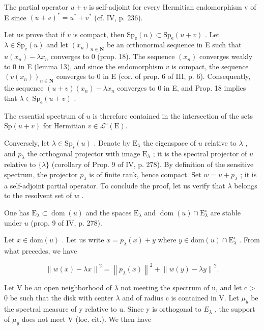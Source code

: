 The partial operator \(u + v\) is self-adjoint for every Hermitian endomorphism v of E since \((u + v)^{*} = u^{*} + v^{*}\) (cf. IV, p. 236).

Let us prove that if \(v\) is compact, then \(\mathrm{Sp_e}(u) \subset \mathrm{Sp_e}(u + v)\) . Let \(\lambda \in \mathrm{Sp_e}(u)\) and let \((x_n)_{n \in \mathbf{N}}\) be an orthonormal sequence in E such that \(u(x_n) - \lambda x_n\) converges to 0 (prop. 18). The sequence \((x_n)\) converges weakly to 0 in E (lemma 13), and since the endomorphism \(v\) is compact, the sequence \((v(x_n))_{n \in \mathbf{N}}\) converges to 0 in E (cor. of prop. 6 of III, p. 6). Consequently, the sequence \((u+v)(x_{n})-\lambda x_{n}\) converges to 0 in E, and Prop. 18 implies that \(\lambda\in\mathrm{Sp}_{\mathrm{e}}(u+v)\) .

The essential spectrum of \(u\) is therefore contained in the intersection of the sets \(\mathrm{Sp}(u + v)\) for Hermitian \(v \in \mathcal{L}^{\mathrm{c}}(\mathrm{E})\).

Conversely, let \(\lambda \in \mathrm{Sp}_{\mathrm{s}}(u)\) . Denote by \(\mathrm{E}_{\lambda}\) the eigenspace of \(u\) relative to \(\lambda\) , and \(p_{\lambda}\) the orthogonal projector with image \(\mathrm{E}_{\lambda}\) ; it is the spectral projector of \(u\) relative to \(\{\lambda\}\) (corollary of Prop. 9 of IV, p. 278). By definition of the sensitive spectrum, the projector \(p_{\lambda}\) is of finite rank, hence compact. Set \(w = u + p_{\lambda}\) ; it is a self-adjoint partial operator. To conclude the proof, let us verify that \(\lambda\) belongs to the resolvent set of \(w\) .

One has \(\mathrm{E}_{\lambda} \subset \operatorname{dom}(u)\) and the spaces \(\mathrm{E}_{\lambda}\) and \(\operatorname{dom}(u) \cap \mathrm{E}_{\lambda}^{\circ}\) are stable under \(u\) (prop. 9 of IV, p. 278).

Let \(x \in \text{dom}(u)\) . Let us write \(x = p_{\lambda}(x) + y\) where \(y \in \text{dom}(u) \cap \text{E}_{\lambda}^{\circ}\) . From what precedes, we have

\[
\left\| w (x) - \lambda x \right\| ^ {2} = \left\| p _ {\lambda} (x) \right\| ^ {2} + \left\| w (y) - \lambda y \right\| ^ {2}.\tag{21}
\]

Let V be an open neighborhood of \(\lambda\) not meeting the spectrum of u, and let c > 0 be such that the disk with center \(\lambda\) and of radius c is contained in V. Let \(\mu_{y}\) be the spectral measure of y relative to u. Since y is orthogonal to \(E_{\lambda}\) , the support of \(\mu_{y}\) does not meet V (loc. cit.). We then have

